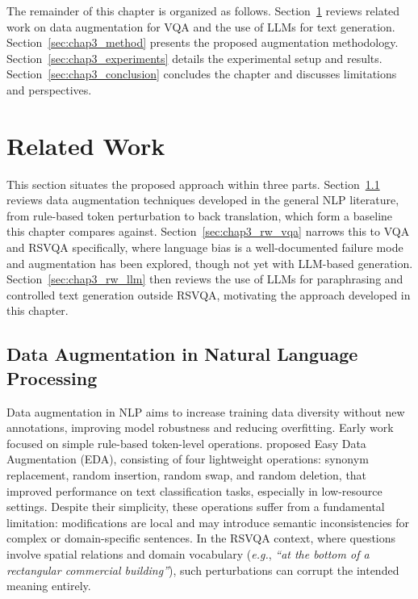 The remainder of this chapter is organized as follows.
Section~\ref{sec:chap3_rw} reviews related work on data
augmentation for VQA and the use of LLMs for text
generation. Section~\ref{sec:chap3_method} presents the
proposed augmentation methodology.
Section~\ref{sec:chap3_experiments} details the experimental
setup and results. Section~\ref{sec:chap3_conclusion} concludes
the chapter and discusses limitations and perspectives.

\section{Related Work}
\label{sec:chap3_rw}
This section situates the proposed approach within three parts. Section~\ref{sec:chap3_rw_nlp} reviews data augmentation techniques developed in the general NLP literature, from rule-based token perturbation to back translation, which form a baseline this chapter compares against. Section~\ref{sec:chap3_rw_vqa} narrows this to VQA and RSVQA specifically, where language bias is a well-documented failure mode and augmentation has been explored, though not yet with LLM-based generation. Section~\ref{sec:chap3_rw_llm} then reviews the use of LLMs for paraphrasing and controlled text generation outside RSVQA, motivating the approach developed in this chapter.
\subsection{Data Augmentation in Natural Language Processing}
\label{sec:chap3_rw_nlp}
 
Data augmentation in NLP aims to increase training data
diversity without new annotations, improving model
robustness and reducing overfitting. Early work focused
on simple rule-based token-level operations.
\textcite{wei2019eda} proposed Easy Data Augmentation (EDA),
consisting of four lightweight operations: synonym
replacement, random insertion, random swap, and random
deletion, that improved performance on text
classification tasks, especially in low-resource settings.
Despite their simplicity, these operations suffer from a
fundamental limitation: modifications are local and may
introduce semantic inconsistencies for complex or
domain-specific sentences. In the RSVQA context, where
questions involve spatial relations and domain vocabulary
(\textit{e.g.}, \textit{``at the bottom of a rectangular
commercial building''}), such perturbations can 
corrupt the intended meaning entirely.
 
